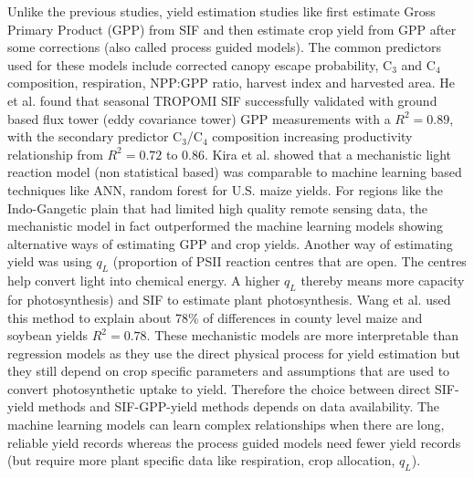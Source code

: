 Unlike the previous studies, yield estimation studies like \cite{guan2016improving} \cite{he2020ground} \cite{kira2024scalable} \cite{xue2025lightweight} \cite{wang2025practical} first estimate Gross Primary Product (GPP) from SIF and then estimate crop yield from GPP after some corrections (also called process guided models). The common predictors used for these models include corrected canopy escape probability, C$_3$ and C$_4$ composition, respiration, NPP:GPP ratio, harvest index and harvested area. He et al. \cite{he2020ground} found that seasonal TROPOMI SIF successfully validated with ground based flux tower (eddy covariance tower) GPP measurements with a $R^2=0.89$, with the secondary predictor C$_3$/C$_4$ composition increasing productivity relationship from $R^2=0.72$ to 0.86. Kira et al. \cite{kira2024scalable} showed that a mechanistic light reaction model (non statistical based) was comparable to machine learning based techniques like ANN, random forest for U.S. maize yields. For regions like the Indo-Gangetic plain that had limited high quality remote sensing data, the mechanistic model in fact outperformed the machine learning models showing alternative ways of estimating GPP and crop yields. Another way of estimating yield was using $q_L$ (proportion of PSII reaction centres that are open. The centres help convert light into chemical energy. A higher $q_L$ thereby means more capacity for photosynthesis) and SIF to estimate plant photosynthesis. Wang et al. \cite{wang2025practical} used this method to explain about 78\% of differences in county level maize and soybean yields $R^2 = 0.78$. These mechanistic models are more interpretable than regression models as they use the direct physical process for yield estimation but they still depend on crop specific parameters and assumptions that are used to convert photosynthetic uptake to yield. Therefore the choice between direct SIF-yield methods and SIF-GPP-yield methods depends on data availability. The machine learning models can learn complex relationships when there are long, reliable yield records whereas the process guided models need fewer yield records (but require more plant specific data like respiration, crop allocation, $q_L$).

